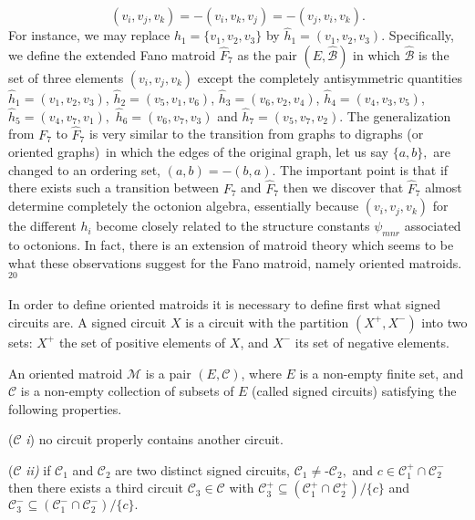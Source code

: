 \documentclass[a4paper,12pt]{article}
\begin{document}
\begin{equation}
(v_{i},v_{j},v_{k})=-(v_{i},v_{k},v_{j})=-(v_{j},v_{i},v_{k}).  \label{5}
\end{equation}
For instance, we may replace $h_{1}=\{v_{1},v_{2},v_{3}\}$ by $\hat{h}%
_{1}=(v_{1},v_{2},v_{3})$. Specifically, we define the extended Fano matroid 
$\hat{F}_{7}$ as the pair $(E,\mathcal{\hat{B}})$ in which $\mathcal{\hat{B}}
$ is the set of three elements $(v_{i},v_{j},v_{k})$ except the completely
antisymmetric quantities $\hat{h}_{1}=(v_{1},v_{2},v_{3})$, $\hat{h}%
_{2}=(v_{5},v_{1},v_{6})$, $\hat{h}_{3}=(v_{6},v_{2},v_{4})$, $\hat{h}%
_{4}=(v_{4},v_{3},v_{5})$, $\hat{h}_{5}=(v_{4},v_{7},v_{1}),$ $\hat{h}%
_{6}=(v_{6},v_{7},v_{3})$ and $\hat{h}_{7}=(v_{5},v_{7},v_{2})$. The
generalization from $F_{7}$ to $\hat{F}_{7}$ is very similar to the
transition from graphs to digraphs (or oriented graphs)\ in which the edges
of the original graph, let us say $\{a,b\},$ are changed to an ordering set, 
$(a,b)=-(b,a)$. The important point is that if there exists such a
transition between $F_{7}$ and $\hat{F}_{7}$ then we discover that $\hat{F}%
_{7}$ almost determine completely the octonion algebra, essentially because $%
(v_{i},v_{j},v_{k})$ for the different $h_{i}$ become closely related to the
structure constants $\psi _{mnr}$ associated to octonions. In fact, there is
an extension of matroid theory which seems to be what these observations
suggest for the Fano matroid, namely oriented matroids.$^{20}$

In order to define oriented matroids it is necessary to define first what
signed circuits are. A signed circuit $X$ is a circuit with the partition $%
(X^{+},X^{-})$ into two sets: $X^{+}$ the set of positive elements of $X$,
and $X^{-}$ its set of negative elements.

An oriented matroid $\mathcal{M}$ is a pair $(E,\mathcal{C})$, where $E$ is
a non-empty finite set, and $\mathcal{C}$ is a non-empty collection of
subsets of $E$ (called signed circuits) satisfying the following properties.

($\mathcal{C}$ \textit{i}) no circuit properly contains another circuit.

($\mathcal{C}$ \textit{ii) }if $\mathcal{C}_{1}$ and $\mathcal{C}_{2}$ are
two distinct signed circuits, $\mathcal{C}_{1}\neq $-$\mathcal{C}_{2},$ and $%
c\in \mathcal{C}_{1}^{+}\cap \mathcal{C}_{2}^{-}$ then there exists a third
circuit $\mathcal{C}_{3}\in \mathcal{C}$ with $\mathcal{C}_{3}^{+}\subseteq (%
\mathcal{C}_{1}^{+}\cap \mathcal{C}_{2}^{+})/\{c\}$ and $\mathcal{C}%
_{3}^{-}\subseteq (\mathcal{C}_{1}^{-}\cap \mathcal{C}_{2}^{-})/\{c\}.$
\end{document}
